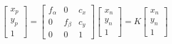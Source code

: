 \begin{equation}
  \begin{bmatrix}
    x_p \\ y_p \\ 1 
  \end{bmatrix}
  =
  \begin{bmatrix}
    f_{\alpha} & 0         & c_x \\
    0          & f_{\beta} & c_y \\
    0          & 0         & 1
  \end{bmatrix}
  \begin{bmatrix}
    x_n \\ y_n \\ 1
  \end{bmatrix}
  = K
  \begin{bmatrix}
    x_n \\ y_n \\ 1
  \end{bmatrix}
\label{eq:idp5}
\end{equation}